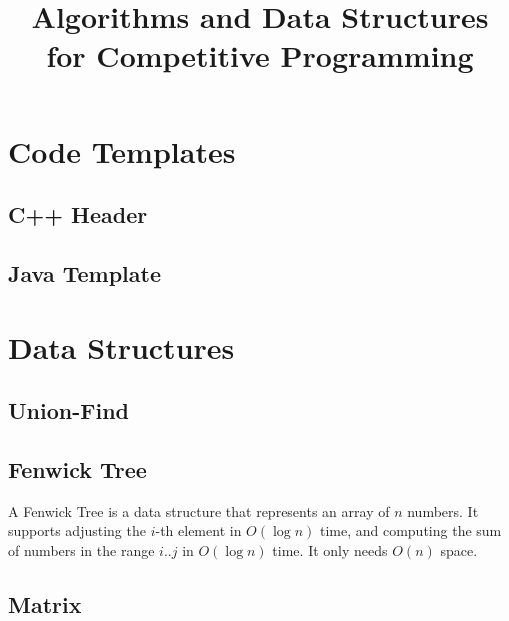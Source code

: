 \documentclass[10pt,a4paper,titlepage]{article}
\title{Algorithms and Data Structures for Competitive Programming}
\begin{document}
	\maketitle
	\tableofcontents
	\newpage

	\section{Code Templates}
		\subsection{C++ Header}
			
		
		\subsection{Java Template}
			

	\section{Data Structures}

		\subsection{Union-Find}
			


		\subsection{Fenwick Tree}
			A Fenwick Tree is a data structure that represents an array of $n$ numbers. It supports adjusting the $i$-th element in $O(\log n)$ time, and computing the sum of numbers in the range $i..j$ in $O(\log n)$ time. It only needs $O(n)$ space.
			


		\subsection{Matrix}
			
\end{document}
